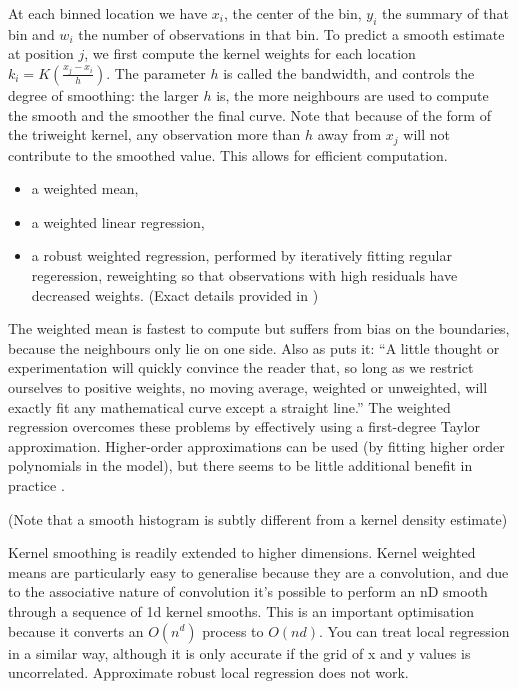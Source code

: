\documentclass[journal]{vgtc}                %
\begin{document}
At each binned location we have $x_i$, the center of the bin, $y_i$ the summary of that bin and $w_i$ the number of observations in that bin. To predict a smooth estimate at position $j$, we first compute the kernel weights for each location $k_i = K(\frac{x_j - x_i}{h})$. The parameter $h$ is called the bandwidth, and controls the degree of smoothing: the larger $h$ is, the more neighbours are used to compute the smooth and the smoother the final curve. Note that because of the form of the triweight kernel, any observation more than $h$ away from $x_j$ will not contribute to the smoothed value.  This allows for efficient computation.

\begin{itemize}
  
  \item a weighted mean,
  
  \item a weighted linear regression,
  
  \item a robust weighted regression, performed by iteratively fitting regular regeression, reweighting so that observations with high residuals have decreased weights. (Exact details provided in \citep{cleveland:1979})

\end{itemize}

The weighted mean is fastest to compute but suffers from bias on the boundaries, because the neighbours only lie on one side.  Also as \citep{macaulay:1931} puts it: ``A little thought or experimentation will quickly convince the reader that, so long as we restrict ourselves to positive weights, no moving average, weighted or unweighted, will exactly fit any mathematical curve except a straight line.''  The weighted regression overcomes these problems by effectively using a first-degree Taylor approximation.  Higher-order approximations can be used (by fitting higher order polynomials in the model), but there seems to be little additional benefit in practice \citep{cleveland:1996}.

(Note that a smooth histogram is subtly different from a kernel density estimate)

Kernel smoothing is readily extended to higher dimensions. Kernel weighted means are particularly easy to generalise because they are a convolution, and due to the associative nature of convolution it's possible to perform an nD smooth through a sequence of 1d kernel smooths. This is an important optimisation because it converts an $O(n^d)$ process to $O(nd)$.  You can treat local regression in a similar way, although it is only accurate if the grid of x and y values is uncorrelated.  Approximate robust local regression does not work.
\end{document}
